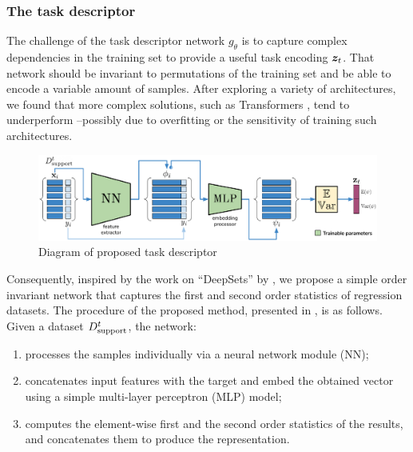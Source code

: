 \documentclass[11pt]{article}
\numberwithin{equation}{subsection}
\begin{document}
\subsubsection{The task descriptor}

The challenge of the task descriptor network $g_\theta$ is to capture complex dependencies in the training set to provide a useful task encoding ${\bm{z}}_t$.
That network should be invariant to permutations of the training set and be able to encode a variable amount of samples.
After exploring a variety of architectures, we found that more complex solutions, such as Transformers \citep{vaswani2017attention}, tend to underperform –possibly due to overfitting or the sensitivity of training such architectures.

\begin{figure}[ht]
  \includegraphics[width=.95\textwidth,center]{adkl/task-descriptor}
  \caption{Diagram of proposed task descriptor}
  \label{fig:task-descriptor}
\end{figure}

Consequently, inspired by the work on ``DeepSets'' by \citet{zaheer2017deep}, we propose a simple order invariant network that captures the first and second order statistics of regression datasets.
The procedure of the proposed method, presented in , is as follows. Given a dataset ${D_{\mathrm{support}}^t}$, the network:
\begin{enumerate}[noitemsep, label=\alph*)]
  \item processes the samples individually via a neural network module (NN);
  \item concatenates input features with the target and embed the obtained vector using a simple multi-layer perceptron (MLP) model;
  \item computes the element-wise first and the second order statistics of the results, and concatenates them to produce the representation.
\end{enumerate}
\end{document}
